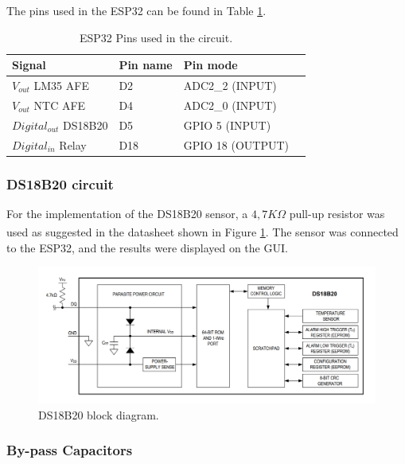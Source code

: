 \documentclass[12pt]{article}
\begin{document}
The pins used in the ESP32 can be found in Table \ref{tab:pins}.


\begin{table}[h]
    \centering
    \caption{ESP32 Pins used in the circuit.}
    \begin{tabularx}{\textwidth}{>{\centering\arraybackslash}X >{\centering\arraybackslash}X >{\centering\arraybackslash}X >{\centering\arraybackslash}X}
        \toprule
        \textbf{Signal} & \textbf{Pin name} & \textbf{Pin mode}\\
        \midrule
        $V_{out}$ LM35 AFE & D2 & ADC2\_2 (INPUT)\\
        \midrule
        $V_{out}$ NTC AFE & D4 & ADC2\_0 (INPUT)\\
        \midrule
        $Digital_{out}$ DS18B20 & D5 & GPIO 5 (INPUT)\\
        \midrule
        $Digital_{in}$ Relay & D18 & GPIO 18 (OUTPUT)\\
        \bottomrule
    \end{tabularx}
    \label{tab:pins}
\end{table}


\subsubsection{DS18B20 circuit}

For the implementation of the DS18B20 sensor, a $4,7K\Omega$ pull-up resistor was used as suggested in the datasheet\textsuperscript{\cite{DS18B20_datasheet}} shown in Figure \ref{fig:ds-block-diagram}. The sensor was connected to the ESP32, and the results were displayed on the GUI. 

\begin{figure}[H] 
    \centering
    \includegraphics*[scale = 0.4]{images/Ds_block_diagram.png}
    \caption{DS18B20 block diagram.}
    \label{fig:ds-block-diagram}
\end{figure}

\subsubsection{By-pass Capacitors}
\end{document}
